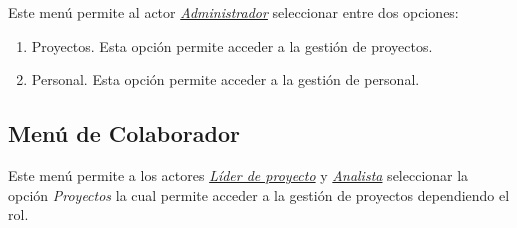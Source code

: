  Este menú permite al actor {\em {\hyperlink{admin}{Administrador}}} seleccionar entre dos opciones:
 
 	\begin{enumerate}
 		\item Proyectos. Esta opción permite acceder a la gestión de proyectos.
 		\item Personal. Esta opción permite acceder a la gestión de personal.
 	\end{enumerate}
 
 
 \subsection{Menú de Colaborador} Este menú permite a los actores {\em {\hyperlink{lider}{Líder de proyecto}}} y {\em {\hyperlink{analista}{Analista}}} seleccionar la opción {\em Proyectos} la cual permite acceder a la gestión de proyectos dependiendo el rol.
 
